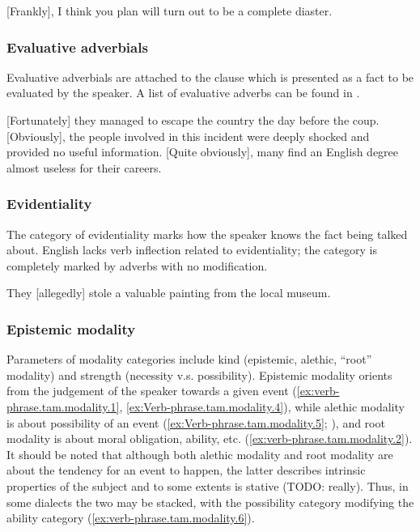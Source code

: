 \documentclass[UTF8, a4paper, oneside, scheme=plain, 12pt]{ctexbook}
\newcommand*{\citepage}[1]{p.~{#1}}
\begin{document}
\begin{exe}
    \ex\label{ex:verb-phrase.tam.speech-act.1}  {} [Frankly], I think you plan will turn out to be a complete diaster. 
\end{exe}

\subsubsection{Evaluative adverbials}

Evaluative adverbials are attached to the clause 
which is presented as a fact to be evaluated by the speaker.
A list of evaluative adverbs can be found in \citet[\citepage{771}, {[2]}]{cgel}.

\begin{exe}
    \ex {} [Fortunately] they managed to escape the country the day before the coup.
    \ex {} [Obviously], the people involved in this incident were deeply shocked and 
    provided no useful information.
    \ex {} [Quite obviously], many find an English degree almost useless for their careers. 
\end{exe}

\subsubsection{Evidentiality}

The category of evidentiality marks how the speaker knows the fact being talked about.
English lacks verb inflection related to evidentiality;
the category is completely marked by adverbs with no modification. 

\begin{exe}
    \ex They [allegedly] stole a valuable painting from the local museum.
\end{exe}

\subsubsection{Epistemic modality}

Parameters of modality categories include kind 
(epistemic, alethic, ``root'' modality) and 
strength (necessity v.s. possibility).
Epistemic modality orients from the judgement of the speaker towards a given event
(\ref{ex:verb-phrase.tam.modality.1}, \ref{ex:Verb-phrase.tam.modality.4}),
while alethic modality is about possibility of an event
(\ref{ex:Verb-phrase.tam.modality.5}; ),
and root modality is about moral obligation,
ability, etc. 
(\ref{ex:verb-phrase.tam.modality.2}).
It should be noted that although both alethic modality and root modality
are about the tendency for an event to happen,
the latter describes intrinsic properties of the subject
and to some extents is stative (TODO: really).
Thus, in some dialects the two may be stacked, 
with the possibility category modifying 
the ability category (\ref{ex:verb-phrase.tam.modality.6}).
\end{document}
